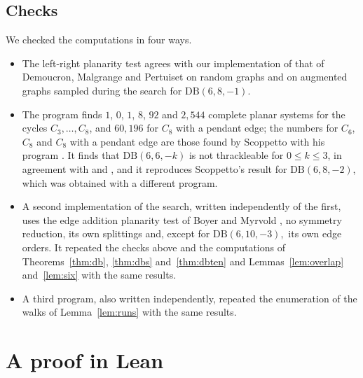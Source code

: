 \documentclass[11pt]{amsart}
\theoremstyle{definition}
\theoremstyle{remark}
\numberwithin{equation}{section}
\newcommand{\DB}{\mathrm{DB}}
\newcommand{\NCEIGHT}{2{,}544}
\newcommand{\NHONE}{60{,}196}
\begin{document}
\subsection{Checks}\label{sec:checks}
We checked the computations in four ways.
\begin{itemize}
\item The left-right planarity test agrees with our implementation of that of Demoucron, Malgrange and Pertuiset \cite{DMP64} on random graphs and on augmented graphs sampled during the search for $\DB(6,8,-1)$.
\item The program finds $1$, $0$, $1$, $8$, $92$ and $\NCEIGHT$ complete planar systems for the cycles $C_3,\dots,C_8$, and $\NHONE$ for $C_8$ with a pendant edge; the numbers for $C_6$, $C_8$ and $C_8$ with a pendant edge are those found by Scoppetto with his program \cite[Section~4]{Sco26}. It finds that $\DB(6,6,-k)$ is not thrackleable for $0\le k\le3$, in agreement with \cite[Theorem~5.1]{LPS97} and \cite[Lemma~6]{FP11}, and it reproduces Scoppetto's result for $\DB(6,8,-2)$, which was obtained with a different program.
\item A second implementation of the search, written independently of the first, uses the edge addition planarity test of Boyer and Myrvold \cite{BM04}, no symmetry reduction, its own splittings and, except for $\DB(6,10,-3)$,\ its own edge orders. It repeated the checks above and the computations of Theorems~\ref{thm:db}, \ref{thm:dbs} and~\ref{thm:dbten} and Lemmas~\ref{lem:overlap} and~\ref{lem:six} with the same results.
\item A third program, also written independently, repeated the enumeration of the walks of Lemma~\ref{lem:runs} with the same results.
\end{itemize}

\section{A proof in Lean}\label{sec:lean}
\end{document}
